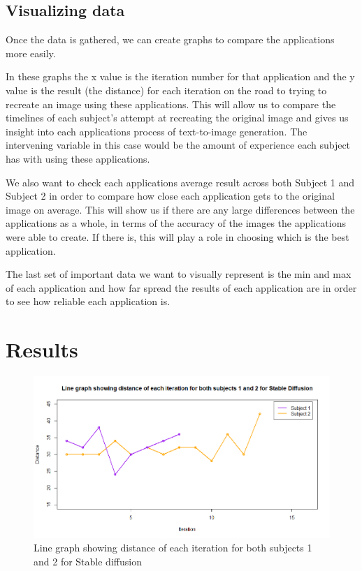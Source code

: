 \documentclass[]{report}
\begin{document}
	
	\subsection{Visualizing data}
	
	Once the data is gathered, we can create graphs to compare the applications more easily. 
	
	In these graphs the x value is the iteration number for that application and the y value is the result (the distance) for each iteration on the road to trying to recreate an image using these applications. This will allow us to compare the timelines of each subject's attempt at recreating the original image and gives us insight into each applications process of text-to-image generation. The intervening variable in this case would be the amount of experience each subject has with using these applications.
	
	We also want to check each applications average result across both Subject 1 and Subject 2 in order to compare how close each application gets to the original image on average. This will show us if there are any large differences between the applications as a whole, in terms of the accuracy of the images the applications were able to create. If there is, this will play a role in choosing which is the best application.
	
	The last set of important data we want to visually represent is the min and max of each application and how far spread the results of each application are in order to see how reliable each application is. 
	
	
	
	\pagebreak
	
	\section{Results}
	
	\begin{figure}[!!htbp]
		\centering
		\includegraphics[width=1\linewidth, trim=0 0 0 50, clip]{LineGraphStableDiff}
		\caption{Line graph showing distance of each iteration for both subjects 1 and 2 for Stable diffusion}
		\label{fig:linegraphstablediff}
	\end{figure}
	
\end{document}
